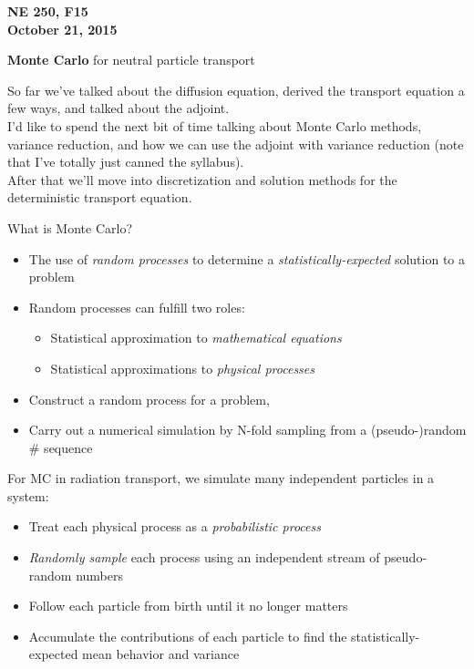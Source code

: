 \documentclass[12pt]{article}
\begin{document}
\begin{center}
{\bf NE 250, F15\\
October 21, 2015 
}
\end{center}

\textbf{Monte Carlo} for neutral particle transport

So far we've talked about the diffusion equation, derived the transport equation a few ways, and talked about the adjoint. \\
I'd like to spend the next bit of time talking about Monte Carlo methods, variance reduction, and how we can use the adjoint with variance reduction (note that I've totally just canned the syllabus). \\
After that we'll move into discretization and solution methods for the deterministic transport equation. 

What is Monte Carlo?
  \begin{itemize}
  \item The use of \textit{random processes} to determine a \textit{statistically-expected} solution to a problem
  \item Random processes can fulfill two roles:
  \begin{itemize}
    \item Statistical approximation to \textit{mathematical equations}
    \item Statistical approximations to \textit{physical processes}
  \end{itemize}   
  \item Construct a random process for a problem, 
  \item Carry out a numerical simulation by N-fold sampling from a (pseudo-)random \# sequence
\end{itemize}

For MC in radiation transport, we simulate many independent particles in a system:
\begin{itemize}
\item Treat each physical process as a \textit{probabilistic process}
\item \textit{Randomly sample} each process using an independent stream of pseudo-random numbers
\item Follow each particle from birth until it no longer matters
\item Accumulate the contributions of each particle to find the statistically-expected mean behavior and variance
\end{itemize}
\end{document}
